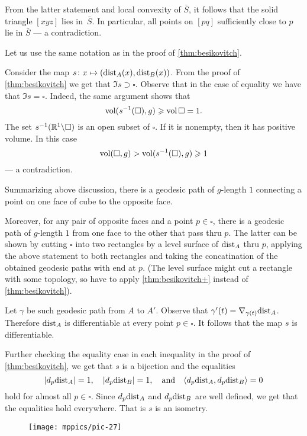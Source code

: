 From the latter statement and local convexity of $\bar S$, 
it follows that the solid triangle $[xyz]$ lies in~$\bar S$.
In particular, all points on $[pq]$ sufficiently close to $p$ lie in $\bar S$ --- a contradiction.

Let us use the same notation as in the proof of \ref{thm:besikovitch}.

Consider the map $s\colon x\mapsto(\mathrm{dist}_A(x),\mathrm{dist}_B(x))$.
From the proof of \ref{thm:besikovitch} we get that $\Im s\supset \square$.
Observe that in the case of equality we have that $\Im s= \square$.
Indeed,
the same argument shows that 
\[\operatorname{\rm vol}\nolimits(s^{-1}(\square),g)\geqslant \operatorname{\rm vol}\nolimits\square=1.\]
The set $s^{-1}(\mathbb{R}^1\backslash \square)$ is an open subset of $\square$.
If it is nonempty, then it has positive volume.
In this case
\[\operatorname{\rm vol}\nolimits(\square,g)>\operatorname{\rm vol}\nolimits(s^{-1}(\square),g)\geqslant 1\]
--- a contradiction.

Summarizing above discussion, there is a geodesic path of $g$-length $1$ connecting a point on one face of cube to the opposite face.

Moreover, for any pair of opposite faces and a point $p\in\square$, there is a geodesic path of $g$-length $1$ from one face to the other that pass thru $p$.
The latter can be shown by cutting $\square$ into two rectangles by a level surface of $\mathrm{dist}_A$ thru $p$,
applying the above statement to both rectangles and taking the concatination of the obtained geodesic paths with end at $p$.
(The level surface might cut a rectangle with some topology, so have to apply \ref{thm:besikovitch+} instead of \ref{thm:besikovitch}).

Let $\gamma$ be such geodesic path from $A$ to $A'$.
Observe that $\gamma'(t)\z=\nabla_{\gamma(t)}\distfun_A$.
Therefore $\mathrm{dist}_A$ is differentiable at every point $p\in \square$.
It follows that the map $s$ is differentiable.

Further checking the equality case in each inequality in the proof of \ref{thm:besikovitch}, we get that $s$ is a bijection and the equalities
\[|d_{p}\mathrm{dist}_A|= 1,\quad|d_{p}\mathrm{dist}_B|=1,\quad \text{and}\quad \langle d_{p}\mathrm{dist}_A,d_{p}\mathrm{dist}_B\rangle= 0\]
hold for almost all $p\in\square$.
Since $d_{p}\mathrm{dist}_A$ and $d_{p}\mathrm{dist}_B$ are well defined, we get that the equalities hold everywhere.
That is $s$ is an isometry.

\begin{wrapfigure}{r}{45 mm}
\vskip-4mm
\centering
\texttt{[image: mppics/pic-27]}
\end{wrapfigure}

